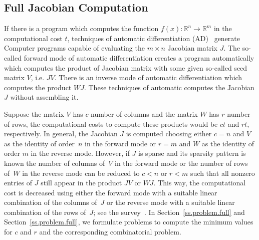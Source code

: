 \documentclass[11pt, twoside,a4paper]{book}
\newcommand{\secref}[1]{Section~\protect\ref{#1}}
\newcommand{\setR}{\ensuremath{\mathbb{R}}}
\newcommand{\col}{\ensuremath{c}}
\newcommand{\row}{\ensuremath{r}}
\begin{document}
\subsection{Full Jacobian Computation}
\label{s.full.jac}
If there is a program which computes the function $f(x) : \setR^n \rightarrow \setR^m$
in the computational cost $t$,
techniques of automatic differentiation (AD)~\cite{Griewank2008EDP,Rall1981ADT} generate
Computer programs capable of evaluating the $m \times n$ Jacobian matrix $J$.
The so-called forward mode of automatic differentiation creates a program automatically
which computes the product of Jacobian matrix with some given so-called seed matrix $V$,
i.e. $JV$. There is an inverse mode of automatic differentiation which computes the product $WJ$.
These techniques of automatic computes the Jacobian $J$ without assembling it.

Suppose the matrix $V$ has $\col$ number of columns and the matrix $W$ has $\row$ number of rows,
the computational costs to compute these products would be $\col t$ and $\row t$, respectively.
In general, the Jacobian $J$ is computed choosing either $c=n$ and $V$ as the identity of
order~$n$ in the forward mode or $r = m$ and $W$ as the identity of order $m$ in the
reverse mode. However, if $J$ is sparse and its sparsity pattern is known the number of
columns of~$V$ in the forward mode or the number of rows of~$W$ in the reverse mode can
be reduced to $\col < n$ or $\row < m$ such that all nonzero entries of $J$ still appear
in the product $JV$ or $WJ$. This way, the computational cost is decreased using either
the forward mode with a suitable linear combination of the columns of~$J$ or the reverse
mode with a suitable linear combination of the rows of~$J$; see the
survey~\cite{Gebremedhin05whatcolor}.
In \secref{ss.problem.full} and \secref{ss.problem.full}, we formulate problems to compute the
minimum values for $\col$ and $\row$ and the corresponding combinatorial problem.
\end{document}
